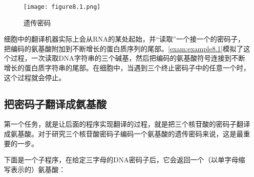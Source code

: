 \begin{figure}
  \centering
  \texttt{[image: figure8.1.png]}
  \caption{遗传密码}
  \label{fig:figure8.1}
\end{figure}

细胞中的翻译机器实际上会从RNA的某处起始，并“读取”一个接一个的密码子，把编码的氨基酸附加到不断增长的蛋白质序列的尾部。\autoref{exam:example8.1}模拟了这个过程，一次读取DNA字符串的三个碱基，然后把编码的氨基酸符号连接到不断增长的蛋白质字符串的尾部。在细胞中，当遇到三个终止密码子中的任意一个时，这个过程就会停止。

\subsection{把密码子翻译成氨基酸}
第一个任务，就是让后面的程序实现翻译的过程，就是把三个核苷酸的密码子翻译成氨基酸。对于研究三个核苷酸密码子编码一个氨基酸的遗传密码来说，这是最重要的一步。

下面是一个子程序，在给定三字母的DNA密码子后，它会返回一个（以单字母缩写表示的）氨基酸：

